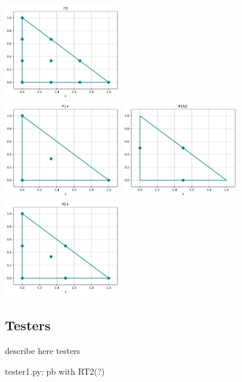 \begin{center}
\includegraphics[width=5cm]{python_codes/fieldstone_120/spaces/P3_nodes}\\
\includegraphics[width=5cm]{python_codes/fieldstone_120/spaces/P1+_nodes}
\includegraphics[width=5cm]{python_codes/fieldstone_120/spaces/P1NC_nodes}
\includegraphics[width=5cm]{python_codes/fieldstone_120/spaces/P2+_nodes}
\end{center}

\newpage
\subsection*{Testers}

describe here testers

tester1.py: pb with  RT2(?) 


